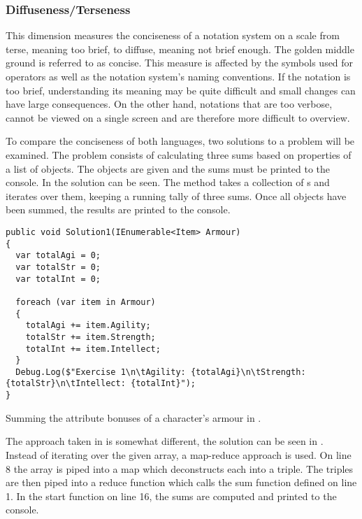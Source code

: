 \subsubsection{Diffuseness/Terseness} %
This dimension measures the conciseness of a notation system on a scale from terse, meaning too brief, to diffuse, meaning not brief enough. The golden middle ground is referred to as concise. This measure is affected by the symbols used for operators as well as the notation system's naming conventions. If the notation is too brief, understanding its meaning may be quite difficult and small changes can have large consequences. On the other hand, notations that are too verbose, cannot be viewed on a single screen and are therefore more difficult to overview.

To compare the conciseness of both languages, two solutions to a problem will be examined. The problem consists of calculating three sums based on properties of a list of objects. The objects are given and the sums must be printed to the console. In  the \cs solution can be seen. The method takes a collection of s and iterates over them, keeping a running tally of three sums. Once all objects have been summed, the results are printed to the console.

\begin{listing}[H]
\begin{verbatim}
public void Solution1(IEnumerable<Item> Armour)
{
  var totalAgi = 0;
  var totalStr = 0;
  var totalInt = 0;

  foreach (var item in Armour)
  {
    totalAgi += item.Agility;
    totalStr += item.Strength;
    totalInt += item.Intellect;
  }
  Debug.Log($"Exercise 1\n\tAgility: {totalAgi}\n\tStrength: {totalStr}\n\tIntellect: {totalInt}");
}
\end{verbatim}
\caption{Summing the attribute bonuses of a character's armour in \cs.}
\label{lst:cs-armour}
\end{listing}

The approach taken in \fs is somewhat different, the solution can be seen in . Instead of iterating over the given array, a map-reduce approach is used. On line 8 the array is piped into a map which deconstructs each  into a triple. The triples are then piped into a reduce function which calls the sum function defined on line 1. In the start function on line 16, the sums are computed and printed to the console.

